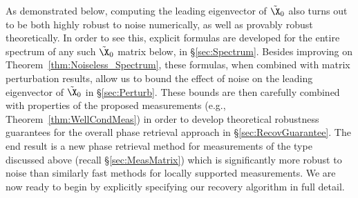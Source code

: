 As demonstrated below, computing the leading eigenvector of $\tilde{\X}_0$ also turns out to be both highly robust to noise numerically, as well as provably robust theoretically.  In order to see this, explicit formulas are developed for the entire spectrum of any such $\tilde{\X}_0$ matrix below, in \S \ref{sec:Spectrum}.  Besides improving on Theorem~\ref{thm:Noiseless_Spectrum}, these formulas, when combined with matrix perturbation results, allow us to bound the effect of noise on the leading eigenvector of $\tilde{\X}_0$ in \S \ref{sec:Perturb}.  These bounds are then carefully combined with properties of the proposed measurements (e.g., Theorem~\ref{thm:WellCondMeas}) in order to develop theoretical robustness guarantees for the overall phase retrieval approach in \S \ref{sec:RecovGuarantee}.  The end result is a new phase retrieval method for measurements of the type discussed above (recall \S \ref{sec:MeasMatrix}) which is significantly more robust to noise than similarly fast methods for locally supported measurements.  We are now ready to begin by explicitly specifying our recovery algorithm in full detail.

